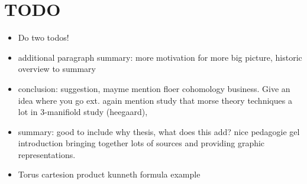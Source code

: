 \chapter*{TODO}
\begin{itemize}
    \item Do two todos!
    \item additional paragraph summary: more motivation for more big picture, historic overview  to summary
    \item conclusion: suggestion, mayme mention floer cohomology business. Give an idea where you go ext.  again mention study that morse theory techniques a lot in 3-manifiold study (heegaard), 
    \item summary: good to include  why thesis, what does this add? nice pedagogie gel introduction bringing together lots of sources and providing graphic representations.
    \item Torus cartesion product kunneth formula example
\end{itemize}
